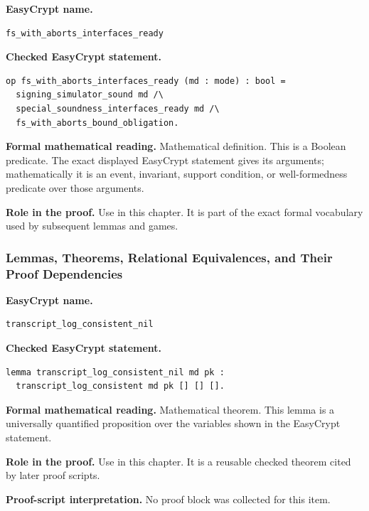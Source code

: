 \begin{formaldefinition}
\noindent\textbf{EasyCrypt name.}
\begin{lstlisting}[language=EasyCrypt,basicstyle=\ttfamily\scriptsize]
fs_with_aborts_interfaces_ready
\end{lstlisting}
\noindent\textbf{Checked EasyCrypt statement.}
\begin{lstlisting}[language=EasyCrypt,basicstyle=\ttfamily\scriptsize]
op fs_with_aborts_interfaces_ready (md : mode) : bool =
  signing_simulator_sound md /\
  special_soundness_interfaces_ready md /\
  fs_with_aborts_bound_obligation.
\end{lstlisting}
\noindent\textbf{Formal mathematical reading.}
Mathematical definition. This is a Boolean predicate.  The exact displayed EasyCrypt statement gives its arguments; mathematically it is an event, invariant, support condition, or well-formedness predicate over those arguments.

\noindent\textbf{Role in the proof.}
Use in this chapter. It is part of the exact formal vocabulary used by subsequent lemmas and games.

\end{formaldefinition}

\subsubsection*{Lemmas, Theorems, Relational Equivalences, and Their Proof Dependencies}
\begin{formaltheorem}[EasyCrypt line 88]
\noindent\textbf{EasyCrypt name.}
\begin{lstlisting}[language=EasyCrypt,basicstyle=\ttfamily\scriptsize]
transcript_log_consistent_nil
\end{lstlisting}
\noindent\textbf{Checked EasyCrypt statement.}
\begin{lstlisting}[language=EasyCrypt,basicstyle=\ttfamily\scriptsize]
lemma transcript_log_consistent_nil md pk :
  transcript_log_consistent md pk [] [] [].
\end{lstlisting}
\noindent\textbf{Formal mathematical reading.}
Mathematical theorem. This lemma is a universally quantified proposition over the variables shown in the EasyCrypt statement.

\noindent\textbf{Role in the proof.}
Use in this chapter. It is a reusable checked theorem cited by later proof scripts.

\noindent\textbf{Proof-script interpretation.}
No proof block was collected for this item.

\end{formaltheorem}

